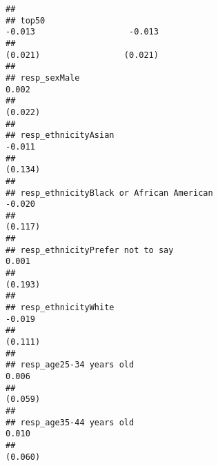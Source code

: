 \documentclass[
]{article}
\begin{document}
\begin{verbatim}
##                                                                                                              
## top50                                                                -0.013                   -0.013         
##                                                                      (0.021)                 (0.021)         
##                                                                                                              
## resp_sexMale                                                                                  0.002          
##                                                                                              (0.022)         
##                                                                                                              
## resp_ethnicityAsian                                                                           -0.011         
##                                                                                              (0.134)         
##                                                                                                              
## resp_ethnicityBlack or African American                                                       -0.020         
##                                                                                              (0.117)         
##                                                                                                              
## resp_ethnicityPrefer not to say                                                               0.001          
##                                                                                              (0.193)         
##                                                                                                              
## resp_ethnicityWhite                                                                           -0.019         
##                                                                                              (0.111)         
##                                                                                                              
## resp_age25-34 years old                                                                       0.006          
##                                                                                              (0.059)         
##                                                                                                              
## resp_age35-44 years old                                                                       0.010          
##                                                                                              (0.060)         

\end{verbatim}
\end{document}
